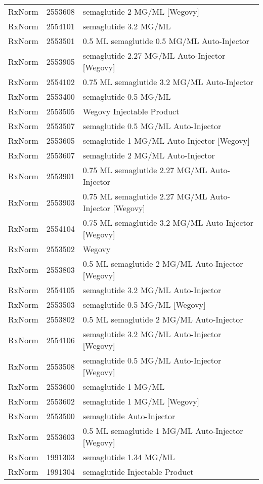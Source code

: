 \begin{longtable}{p{}p{}p{}}
  RxNorm & 2553608 & semaglutide 2 MG/ML [Wegovy] \\ 
  RxNorm & 2554101 & semaglutide 3.2 MG/ML \\ 
  RxNorm & 2553501 & 0.5 ML semaglutide 0.5 MG/ML Auto-Injector \\ 
  RxNorm & 2553905 & semaglutide 2.27 MG/ML Auto-Injector [Wegovy] \\ 
  RxNorm & 2554102 & 0.75 ML semaglutide 3.2 MG/ML Auto-Injector \\ 
  RxNorm & 2553400 & semaglutide 0.5 MG/ML \\ 
  RxNorm & 2553505 & Wegovy Injectable Product \\ 
  RxNorm & 2553507 & semaglutide 0.5 MG/ML Auto-Injector \\ 
  RxNorm & 2553605 & semaglutide 1 MG/ML Auto-Injector [Wegovy] \\ 
  RxNorm & 2553607 & semaglutide 2 MG/ML Auto-Injector \\ 
  RxNorm & 2553901 & 0.75 ML semaglutide 2.27 MG/ML Auto-Injector \\ 
  RxNorm & 2553903 & 0.75 ML semaglutide 2.27 MG/ML Auto-Injector [Wegovy] \\ 
  RxNorm & 2554104 & 0.75 ML semaglutide 3.2 MG/ML Auto-Injector [Wegovy] \\ 
  RxNorm & 2553502 & Wegovy \\ 
  RxNorm & 2553803 & 0.5 ML semaglutide 2 MG/ML Auto-Injector [Wegovy] \\ 
  RxNorm & 2554105 & semaglutide 3.2 MG/ML Auto-Injector \\ 
  RxNorm & 2553503 & semaglutide 0.5 MG/ML [Wegovy] \\ 
  RxNorm & 2553802 & 0.5 ML semaglutide 2 MG/ML Auto-Injector \\ 
  RxNorm & 2554106 & semaglutide 3.2 MG/ML Auto-Injector [Wegovy] \\ 
  RxNorm & 2553508 & semaglutide 0.5 MG/ML Auto-Injector [Wegovy] \\ 
  RxNorm & 2553600 & semaglutide 1 MG/ML \\ 
  RxNorm & 2553602 & semaglutide 1 MG/ML [Wegovy] \\ 
  RxNorm & 2553500 & semaglutide Auto-Injector \\ 
  RxNorm & 2553603 & 0.5 ML semaglutide 1 MG/ML Auto-Injector [Wegovy] \\ 
  RxNorm & 1991303 & semaglutide 1.34 MG/ML \\ 
  RxNorm & 1991304 & semaglutide Injectable Product \\ 

\end{longtable}
